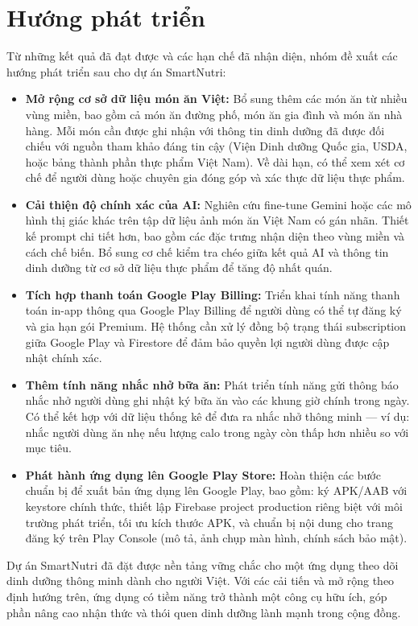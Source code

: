 \section*{Hướng phát triển}

Từ những kết quả đã đạt được và các hạn chế đã nhận diện, nhóm đề xuất các hướng phát triển sau cho dự án SmartNutri:

\begin{itemize}
    \item \textbf{Mở rộng cơ sở dữ liệu món ăn Việt:} Bổ sung thêm các món ăn từ nhiều vùng miền, bao gồm cả món ăn đường phố, món ăn gia đình và món ăn nhà hàng. Mỗi món cần được ghi nhận với thông tin dinh dưỡng đã được đối chiếu với nguồn tham khảo đáng tin cậy (Viện Dinh dưỡng Quốc gia, USDA, hoặc bảng thành phần thực phẩm Việt Nam). Về dài hạn, có thể xem xét cơ chế để người dùng hoặc chuyên gia đóng góp và xác thực dữ liệu thực phẩm.

    \item \textbf{Cải thiện độ chính xác của AI:} Nghiên cứu fine-tune Gemini hoặc các mô hình thị giác khác trên tập dữ liệu ảnh món ăn Việt Nam có gán nhãn. Thiết kế prompt chi tiết hơn, bao gồm các đặc trưng nhận diện theo vùng miền và cách chế biến. Bổ sung cơ chế kiểm tra chéo giữa kết quả AI và thông tin dinh dưỡng từ cơ sở dữ liệu thực phẩm để tăng độ nhất quán.

    \item \textbf{Tích hợp thanh toán Google Play Billing:} Triển khai tính năng thanh toán in-app thông qua Google Play Billing để người dùng có thể tự đăng ký và gia hạn gói Premium. Hệ thống cần xử lý đồng bộ trạng thái subscription giữa Google Play và Firestore để đảm bảo quyền lợi người dùng được cập nhật chính xác.

    \item \textbf{Thêm tính năng nhắc nhở bữa ăn:} Phát triển tính năng gửi thông báo nhắc nhở người dùng ghi nhật ký bữa ăn vào các khung giờ chính trong ngày. Có thể kết hợp với dữ liệu thống kê để đưa ra nhắc nhở thông minh — ví dụ: nhắc người dùng ăn nhẹ nếu lượng calo trong ngày còn thấp hơn nhiều so với mục tiêu.

    \item \textbf{Phát hành ứng dụng lên Google Play Store:} Hoàn thiện các bước chuẩn bị để xuất bản ứng dụng lên Google Play, bao gồm: ký APK/AAB với keystore chính thức, thiết lập Firebase project production riêng biệt với môi trường phát triển, tối ưu kích thước APK, và chuẩn bị nội dung cho trang đăng ký trên Play Console (mô tả, ảnh chụp màn hình, chính sách bảo mật).
\end{itemize}

Dự án SmartNutri đã đặt được nền tảng vững chắc cho một ứng dụng theo dõi dinh dưỡng thông minh dành cho người Việt. Với các cải tiến và mở rộng theo định hướng trên, ứng dụng có tiềm năng trở thành một công cụ hữu ích, góp phần nâng cao nhận thức và thói quen dinh dưỡng lành mạnh trong cộng đồng.

\newpage
